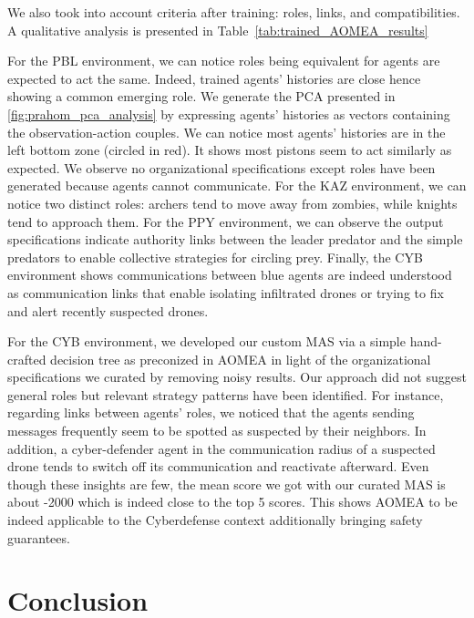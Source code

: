 \documentclass[runningheads]{llncs}
\begin{document}
We also took into account criteria after training: roles, links, and compatibilities. A qualitative analysis is presented in Table~\ref{tab:trained_AOMEA_results}
%

%
%
For the PBL environment, we can notice roles being equivalent for agents are expected to act the same. Indeed, trained agents' histories are close hence showing a common emerging role. We generate the PCA presented in \autoref{fig:prahom_pca_analysis} by expressing agents' histories as vectors containing the observation-action couples. We can notice most agents’ histories are in the left bottom zone (circled in red). It shows most pistons seem to act similarly as expected. We observe no organizational specifications except roles have been generated because agents cannot communicate. For the KAZ environment, we can notice two distinct roles: archers tend to move away from zombies, while knights tend to approach them. For the PPY environment, we can observe the output specifications indicate authority links between the leader predator and the simple predators to enable collective strategies for circling prey. Finally, the CYB environment shows communications between blue agents are indeed understood as communication links that enable isolating infiltrated drones or trying to fix and alert recently suspected drones.

For the CYB environment, we developed our custom MAS via a simple hand-crafted decision tree as preconized in AOMEA in light of the organizational specifications we curated by removing noisy results. Our approach did not suggest general roles but relevant strategy patterns have been identified. For instance, regarding links between agents' roles, we noticed that the agents sending messages frequently seem to be spotted as suspected by their neighbors. In addition, a cyber-defender agent in the communication radius of a suspected drone tends to switch off its communication and reactivate afterward. Even though these insights are few, the mean score we got with our curated MAS is about -2000 which is indeed close to the top 5 scores. This shows AOMEA to be indeed applicable to the Cyberdefense context additionally bringing safety guarantees.

\section{Conclusion}

\end{document}
